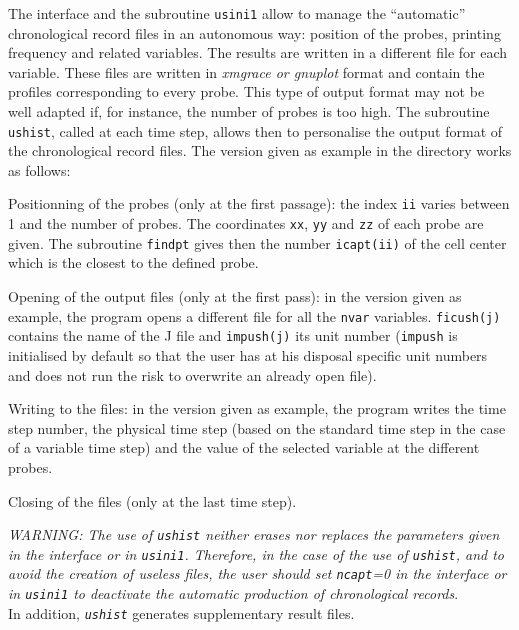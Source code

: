 {{{The interface and the subroutine \texttt{usini1} allow to manage the
``automatic'' chronological record files in an autonomous way:
position of the probes, printing frequency and related variables. The
results are written in a different file for each variable. These files
are written in {\em xmgrace or {\em gnuplot}} format and contain the profiles corresponding to
every probe. This type of output format may not be well adapted if, for
instance, the number of probes is too high. The subroutine
\texttt{ushist}, called at each time step, allows then to personalise the output format of the
chronological record files. The version given as example in the
directory works as follows:

\begin{list}{-}{}
\item Positionning of the probes (only at the first passage): the index
      \texttt{ii} varies between 1 and the number of probes. The coordinates
      \texttt{xx}, \texttt{yy} and \texttt{zz} of each probe are given.
      The subroutine \texttt{findpt}
      gives then the number \texttt{icapt(ii)} of the cell center
      which is the closest to the defined probe.

\item Opening of the output files (only at the first pass): in the
      version given as example, the program opens a different file for
      all the \texttt{nvar} variables. \texttt{ficush(j)} contains the name of the
      J\raisebox{1ex}{\small th} file and \texttt{impush(j)} its unit number
      (\texttt{impush} is initialised by default so that the user has at his
      disposal specific unit numbers and does not run the risk to overwrite an
      already open file).

\item Writing to the files: in the version given as example, the program
      writes the time step number, the physical time step (based on the
      standard time step in the case of a variable time step) and the
      value of the selected variable at the different probes.

\item Closing of the files (only at the last time step).

\end{list}

{\em WARNING: The use of {\em\texttt{ushist}} neither erases nor replaces the
parameters given in the interface or in {\em\texttt{usini1}}. Therefore, in
the case of the use of {\em\texttt{ushist}}, and to avoid the creation
of useless files, the user should set {\em \texttt{ncapt}=0} in the interface or
in {\em \texttt{usini1}} to deactivate the automatic production of
chronological records}.\\
In addition, {\em \texttt{ushist}} generates supplementary result
files.


}}}
